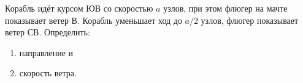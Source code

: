 Корабль идёт курсом ЮВ со скоростью $a$ узлов, при этом флюгер на
мачте показывает ветер В. Корабль уменьшает ход до $a/2$ узлов, флюгер
показывает ветер СВ. Определить: \begin{enumerate}
\item направление и
\item скорость ветра.
\end{enumerate}
